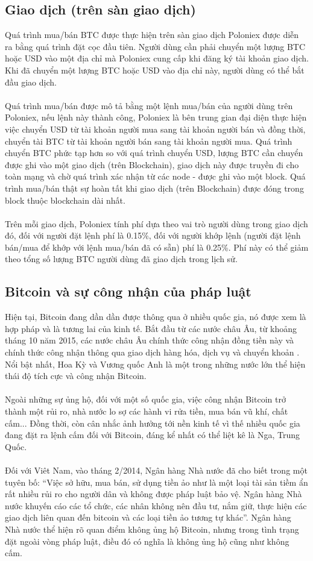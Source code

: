 \subsection{Giao dịch (trên sàn giao dịch)}
Quá trình mua/bán BTC được thực hiện trên sàn giao dịch Poloniex được diễn ra 
bằng quá trình đặt cọc đầu tiên. Người dùng cần phải chuyển một lượng BTC hoặc 
USD vào một địa chỉ mà Poloniex cung cấp khi đăng ký tài khoản giao dịch. Khi 
đã chuyển một lượng BTC hoặc USD vào địa chỉ này, người dùng có thể bắt đầu 
giao dịch.\\\\
Quá trình mua/bán được mô tả bằng một lệnh mua/bán của người dùng trên Poloniex, 
nếu lệnh này thành công, Poloniex là bên trung gian đại diện thực hiện việc chuyển 
USD từ tài khoản người mua sang tài khoản người bán và đồng thời, chuyển tài BTC 
từ tài khoản người bán sang tài khoản người mua. Quá trình chuyển BTC phức tạp 
hơn so với quá trình chuyển USD, lượng BTC cần chuyển được ghi vào một giao dịch 
(trên Blockchain), giao dịch này được truyền đi cho toàn mạng và chờ quá trình 
xác nhận từ các node - được ghi vào một block. Quá trình mua/bán thật sự hoàn 
tất khi giao dịch (trên Blockchain) được đóng trong block thuộc blockchain dài 
nhất.\\\\
Trên mỗi giao dịch, Poloniex tính phí dựa theo vai trò người dùng trong giao 
dịch đó, đối với người đặt lệnh phí là 0.15\%, đối với người khớp lệnh (người 
đặt lệnh bán/mua để khớp với lệnh mua/bán đã có sẵn) phí là 0.25\%. Phí này có 
thể giảm theo tổng số lượng BTC người dùng đã giao dịch trong lịch sử.
\subsection{Bitcoin và sự công nhận của pháp luật}
Hiện tại, Bitcoin đang dần dần được thông qua ở nhiều quốc gia, nó được xem là 
hợp pháp và là tương lai của kinh tế. Bắt đầu từ các nước châu Âu, từ khoảng 
tháng 10 năm 2015, các nước châu Âu chính thức công nhận đồng tiền này và chính 
thức công nhận thông qua giao dịch hàng hóa, dịch vụ và chuyển khoản \cite{LawBitcoin}.
Nổi bật nhất, Hoa Kỳ và Vương quốc Anh là một trong những nước lớn thể hiện thái 
độ tích cực và công nhận Bitcoin.\\\\
Ngoài những sự ủng hộ, đối với một số quốc gia, việc công nhận Bitcoin trở thành 
một rủi ro, nhà nước lo sợ các hành vi rửa tiền, mua bán vũ khí, chất cấm... 
Đồng thời, còn cân nhắc ảnh hưởng tới nền kinh tế vì thế nhiều quốc gia đang 
đặt ra lệnh cấm đối với Bitcoin, đáng kể nhất có thể liệt kê là Nga, Trung Quốc.\\\\
Đối với Viêt Nam, vào tháng 2/2014, Ngân hàng Nhà nước đã cho biết trong một 
tuyên bố: ``Việc sở hữu, mua bán, sử dụng tiền ảo như là một loại tài sản tiềm 
ẩn rất nhiều rủi ro cho người dân và không được pháp luật bảo vệ. Ngân hàng Nhà 
nước khuyến cáo các tổ chức, các nhân không nên đầu tư, nắm giữ, thực hiện các 
giao dịch liên quan đến bitcoin và các loại tiền ảo tương tự khác''. Ngân hàng 
Nhà nước thể hiện rõ quan điểm không ủng hộ Bitcoin, nhưng trong tình trạng đặt 
ngoài vòng pháp luật, điều đó có nghĩa là không ủng hộ cũng như không cấm.
